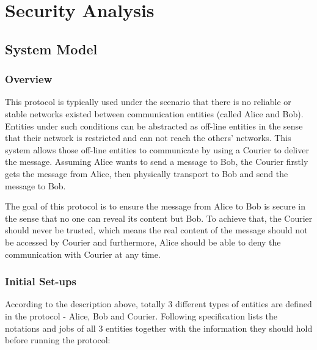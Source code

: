\documentclass[10pt,a4paper]{article}
\begin{document}
\section*{Security Analysis}
\subsection*{System Model}
\subsubsection*{Overview}
This protocol is typically used under the scenario that there is no reliable or stable networks existed between communication entities (called Alice and Bob). Entities under such conditions can be abstracted as off-line entities in the sense that their network is restricted and can not reach the others' networks. This system allows those off-line entities to communicate by using a Courier to deliver the message. Assuming Alice wants to send a message to Bob, the Courier firstly gets the message from Alice, then physically transport to Bob and send the message to Bob. \par
The goal of this protocol is to ensure the message from Alice to Bob is secure in the sense that no one can reveal its content but Bob. To achieve that, the Courier should never be trusted, which means the real content of the message should not be accessed by Courier and furthermore, Alice should be able to deny the communication with Courier at any time.

\subsubsection*{Initial Set-ups}
According to the description above, totally 3 different types of entities are defined in the protocol - Alice, Bob and Courier. Following specification lists the notations and jobs of all 3 entities together with the information they should hold before running the protocol:
\end{document}
